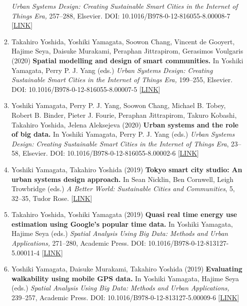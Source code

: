 \documentclass[
]{book}
\begin{document}
\begin{enumerate}
  \emph{Urban Systems Design: Creating Sustainable Smart Cities in the Internet of Things Era,} 257--288, Elsevier.
  DOI: 10.1016/B978-0-12-816055-8.00008-7 {[}\href{https://www.elsevier.com/books/urban-systems-design/yamagata/978-0-12-816055-8}{LINK}{]}
\item
  Takahiro Yoshida, Yoshiki Yamagata, Soowon Chang, Vincent de Gooyert, Hajime Seya, Daisuke Murakami, Peraphan Jittrapirom, Gerasimos Voulgaris (2020)
  \textbf{Spatial modelling and design of smart communities.}
  In Yoshiki Yamagata, Perry P. J. Yang (eds.)
  \emph{Urban Systems Design: Creating Sustainable Smart Cities in the Internet of Things Era,} 199--255, Elsevier.
  DOI: 10.1016/B978-0-12-816055-8.00007-5 {[}\href{https://www.elsevier.com/books/urban-systems-design/yamagata/978-0-12-816055-8}{LINK}{]}
\item
  Yoshiki Yamagata, Perry P. J. Yang, Soowon Chang, Michael B. Tobey, Robert B. Binder, Pieter J. Fourie, Peraphan Jittrapirom, Takuro Kobashi, Takahiro Yoshida, Jelena Aleksejeva (2020)
  \textbf{Urban systems and the role of big data.}
  In Yoshiki Yamagata, Perry P. J. Yang (eds.)
  \emph{Urban Systems Design: Creating Sustainable Smart Cities in the Internet of Things Era}, 23--58, Elsevier.
  DOI: 10.1016/B978-0-12-816055-8.00002-6 {[}\href{https://www.elsevier.com/books/urban-systems-design/yamagata/978-0-12-816055-8}{LINK}{]}
\item
  Yoshiki Yamagata, Takahiro Yoshida (2019)
  \textbf{Tokyo smart city studio: An urban systems design approach.}
  In Sean Nicklin, Ben Cornwell, Leigh Trowbridge (eds.)
  \emph{A Better World: Sustainable Cities and Communities}, 5, 32--35, Tudor Rose.
  {[}\href{http://unhabitat.org.mm/publications/a-better-world-volume-5/}{LINK}{]}
\item
  Takahiro Yoshida, Yoshiki Yamagata (2019)
  \textbf{Quasi real time energy use estimation using Google's popular time data.}
  In Yoshiki Yamagata, Hajime Seya (eds.)
  \emph{Spatial Analysis Using Big Data: Methods and Urban Applications,} 271--280, Academic Press.
  DOI: 10.1016/B978-0-12-813127-5.00011-4 {[}\href{https://www.elsevier.com/books/spatial-analysis-using-big-data/yamagata/978-0-12-813127-5}{LINK}{]}
\item
  Yoshiki Yamagata, Daisuke Murakami, Takahiro Yoshida (2019)
  \textbf{Evaluating walkability using mobile GPS data.}
  In Yoshiki Yamagata, Hajime Seya (eds.)
  \emph{Spatial Analysis Using Big Data: Methods and Urban Applications,} 239--257, Academic Press.
  DOI: 10.1016/B978-0-12-813127-5.00009-6 {[}\href{https://www.elsevier.com/books/spatial-analysis-using-big-data/yamagata/978-0-12-813127-5}{LINK}{]}

\end{enumerate}
\end{document}

